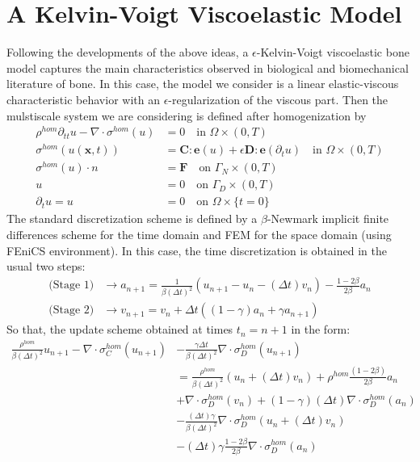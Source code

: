 \section{A Kelvin-Voigt Viscoelastic Model}
Following the developments of the above ideas, a $\epsilon$-Kelvin-Voigt viscoelastic bone model captures the main characteristics observed in biological and biomechanical literature of bone. In this case, the model we consider is a linear elastic-viscous characteristic behavior with an $\epsilon$-regularization of the viscous part.
Then the mulstiscale system we are considering is defined after homogenization by
\begin{align*}
     \rho^{hom} \partial_{tt} u - \nabla \cdot \sigma^{hom}(u) & = 0 \quad \text{in } \Omega \times (0,T) \\
    \sigma^{hom}(u(\mathbf{x},t)) & =  \mathbf{C}:\mathbf{e}(u) + \epsilon \mathbf{D}:\mathbf{e}(\partial_{t}u) \quad \text{in }\Omega \times (0,T)\\
    \sigma^{hom}(u)\cdot n & = \mathbf{F} \quad \text{on }\Gamma_N\times (0,T) \\
    u & = 0 \quad \text{on }\Gamma_D \times (0,T) \\
    \partial_t u = u & = 0 \quad \text{on } \Omega \times \{t=0\}
\end{align*}
The standard discretization scheme is defined by a $\beta$-Newmark implicit finite differences scheme for the time domain and FEM for the space domain (using FEniCS environment). In this case, the time discretization is obtained in the usual two steps:
\begin{align*}
    \text{(Stage 1)} &\longrightarrow a_{n+1} = \frac{1}{\beta (\Delta t)^2} (u_{n+1}-u_{n}-(\Delta t)v_n) - \frac{1-2\beta}{2\beta}a_n\\
    \text{(Stage 2)}& \longrightarrow v_{n+1} = v_n + \Delta t((1-\gamma)a_n + \gamma a_{n+1})
\end{align*}
So that, the update scheme obtained at times $t_n = n+1$ in the form:
\begin{align*}
    \frac{\rho^{hom}}{\beta (\Delta t)^2} u_{n+1} - \nabla \cdot \sigma_C^{hom}( u_{n+1})  & - \frac{\gamma \Delta t}{\beta (\Delta t)^2} \nabla \cdot \sigma_D^{hom}(u_{n+1}) \\
    &= \frac{\rho^{hom}}{\beta (\Delta t)^2} (u_n + (\Delta t)v_n) + \rho^{hom}\frac{ (1-2\beta)}{2\beta} a_n \\
    & + \nabla \cdot \sigma_D^{hom}(v_n) + (1-\gamma)(\Delta t) \nabla\cdot \sigma_D^{hom}(a_n) \\
    & - \frac{(\Delta t)\gamma}{\beta (\Delta t)^2}\nabla \cdot \sigma_D^{hom}(u_n + (\Delta t)v_n) \\
    & - (\Delta t)\gamma\frac{1-2\beta}{2 \beta} \nabla \cdot \sigma_D^{hom}(a_n)
\end{align*}


